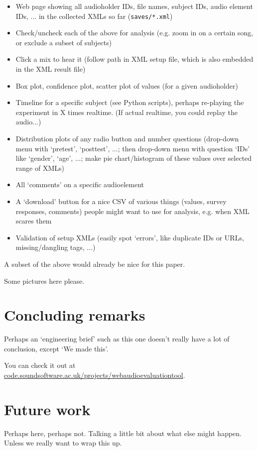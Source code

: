 \documentclass{sig-alternate}
\begin{document}
	\begin{itemize}
		\item Web page showing all audioholder IDs, file names, subject IDs, audio element IDs, ... in the collected XMLs so far (\texttt{saves/*.xml})
		\item Check/uncheck each of the above for analysis (e.g. zoom in on a certain song, or exclude a subset of subjects)
		\item Click a mix to hear it (follow path in XML setup file, which is also embedded in the XML result file)
		\item Box plot, confidence plot, scatter plot of values (for a given audioholder)
		\item Timeline for a specific subject (see Python scripts), perhaps re-playing the experiment in X times realtime. (If actual realtime, you could replay the audio...)
		\item Distribution plots of any radio button and number questions (drop-down menu with `pretest', `posttest', ...; then drop-down menu with question `IDs' like `gender', `age', ...; make pie chart/histogram of these values over selected range of XMLs)
		\item All `comments' on a specific audioelement
		\item A `download' button for a nice CSV of various things (values, survey responses, comments) people might want to use for analysis, e.g. when XML scares them
		\item Validation of setup XMLs (easily spot `errors', like duplicate IDs or URLs, missing/dangling tags, ...)
	\end{itemize}

	A subset of the above would already be nice for this paper. 
	
	Some pictures here please. 

\section{Concluding remarks}
	Perhaps an `engineering brief' such as this one doesn't really have a lot of conclusion, except `We made this'. 
	
	You can check it out at \url{code.soundsoftware.ac.uk/projects/webaudioevaluationtool}. 
	
\section{Future work}
	Perhaps here, perhaps not. Talking a little bit about what else might happen. Unless we really want to wrap this up. 

%

%
%
\end{document}

